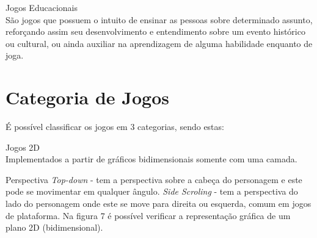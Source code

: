 \begin{alineascomponto}	
\item Jogos Educacionais\\
São jogos que possuem o intuito de ensinar as pessoas sobre determinado assunto, reforçando assim seu desenvolvimento e entendimento sobre um evento histórico ou cultural, ou ainda auxiliar na aprendizagem de alguma habilidade enquanto de joga. \cite{jd}

\end{alineascomponto}

\section{Categoria de Jogos}
\label{sec:categoria-de-jogos}

É possível classificar os jogos em 3 categorias, sendo estas:
\begin{alineascomponto}

\item Jogos 2D\\
Implementados a partir de gráficos bidimensionais somente com uma camada.

 Perspectiva \textit{ Top-down} - tem a perspectiva sobre a cabeça do personagem e este pode se movimentar em qualquer ângulo.
 \textit{Side Scroling} - tem a perspectiva do lado do personagem onde este se move para direita ou esquerda, comum em jogos de plataforma. Na figura 7 é possível verificar a representação gráfica de um plano 2D (bidimensional). \cite{graf}

\end{alineascomponto}


\begin{figure}[h!]
		\centering
	\end{figure}

